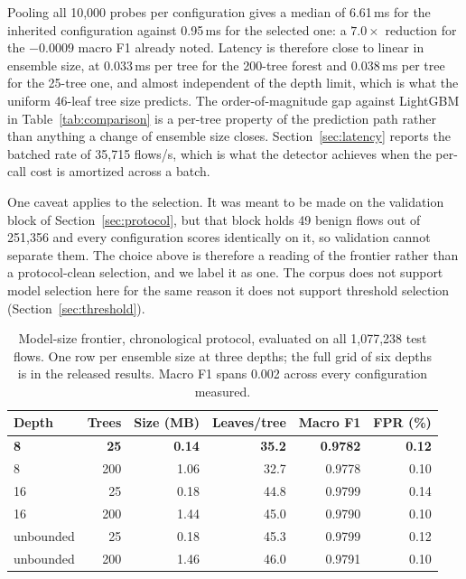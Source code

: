 \documentclass{ieeeaccess}
\begin{document}
Pooling all 10,000 probes per configuration gives a median of 6.61\,ms for the
inherited configuration against 0.95\,ms for the selected one: a $7.0\times$
reduction for the $-0.0009$ macro F1 already noted. Latency is therefore close to
linear in ensemble size, at 0.033\,ms per tree for the 200-tree forest and
0.038\,ms per tree for the 25-tree one, and almost independent of the depth
limit, which is what the uniform 46-leaf tree size predicts. The order-of-magnitude
gap against LightGBM in Table~\ref{tab:comparison} is a per-tree property of the
prediction path rather than anything a change of ensemble size closes.
Section~\ref{sec:latency} reports the batched rate of 35,715 flows/s, which is
what the detector achieves when the per-call cost is amortized across a batch.

One caveat applies to the selection. It was meant to be made on the validation
block of Section~\ref{sec:protocol}, but that block holds 49 benign flows out of
251,356 and every configuration scores identically on it, so validation cannot
separate them. The
choice above is therefore a reading of the frontier rather than a protocol-clean
selection, and we label it as one. The corpus does not support model selection
here for the same reason it does not support threshold selection
(Section~\ref{sec:threshold}).

\begin{table}[!t]
\caption{Model-size frontier, chronological protocol, evaluated on all 1,077,238
test flows. One row per ensemble size at three depths; the full grid of six
depths is in the released results. Macro F1 spans 0.002 across every
configuration measured.}
\centering
\label{tab:pareto}
\footnotesize
\setlength{\tabcolsep}{4pt}
\renewcommand{\arraystretch}{1.15}
\begin{tabular}{@{}lrrrrr@{}}
\toprule
\textbf{Depth} & \textbf{Trees} & \textbf{Size (MB)} & \textbf{Leaves/tree} &
\textbf{Macro F1} & \textbf{FPR (\%)} \\
\midrule
\textbf{8} & \textbf{25} & \textbf{0.14} & \textbf{35.2} & \textbf{0.9782} & \textbf{0.12} \\
8         & 200 & 1.06 & 32.7 & 0.9778 & 0.10 \\
16        & 25  & 0.18 & 44.8 & 0.9799 & 0.14 \\
16        & 200 & 1.44 & 45.0 & 0.9790 & 0.10 \\
unbounded & 25  & 0.18 & 45.3 & 0.9799 & 0.12 \\
unbounded & 200 & 1.46 & 46.0 & 0.9791 & 0.10 \\
\bottomrule
\end{tabular}
\end{table}
\end{document}
